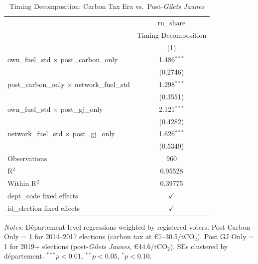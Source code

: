 \begin{table}[htbp]
   \caption{\label{tab:timing_decomp} Timing Decomposition: Carbon Tax Era vs.\ Post-\textit{Gilets Jaunes}}
   \bigskip
   \centering
   \begin{tabular}{lc}
      \toprule
                                                          & rn\_share\\   
                                                          & Timing Decomposition \\   
                                                          & (1)\\  
      \midrule 
      own\_fuel\_std $\times$ post\_carbon\_only          & 1.486$^{***}$\\   
                                                          & (0.2746)\\   
      post\_carbon\_only $\times$ network\_fuel\_std      & 1.298$^{***}$\\   
                                                          & (0.3551)\\   
      own\_fuel\_std $\times$ post\_gj\_only              & 2.121$^{***}$\\   
                                                          & (0.4282)\\   
      network\_fuel\_std $\times$ post\_gj\_only          & 1.626$^{***}$\\   
                                                          & (0.5349)\\
      \midrule
      Observations                                        & 960\\
      R$^2$                                               & 0.95528\\
      Within R$^2$                                        & 0.39775\\
      \midrule
      dept\_code fixed effects                            & $\checkmark$\\
      id\_election fixed effects                          & $\checkmark$\\
      \bottomrule
   \end{tabular}

   \par \raggedright
   \textit{Notes:} D\'{e}partement-level regressions weighted by registered voters. Post Carbon Only = 1 for 2014--2017 elections (carbon tax at \euro 7--30.5/tCO$_2$). Post GJ Only = 1 for 2019+ elections (post-\textit{Gilets Jaunes}, \euro 44.6/tCO$_2$). SEs clustered by d\'{e}partement. $^{***}p<0.01$, $^{**}p<0.05$, $^{*}p<0.10$.
\end{table}
